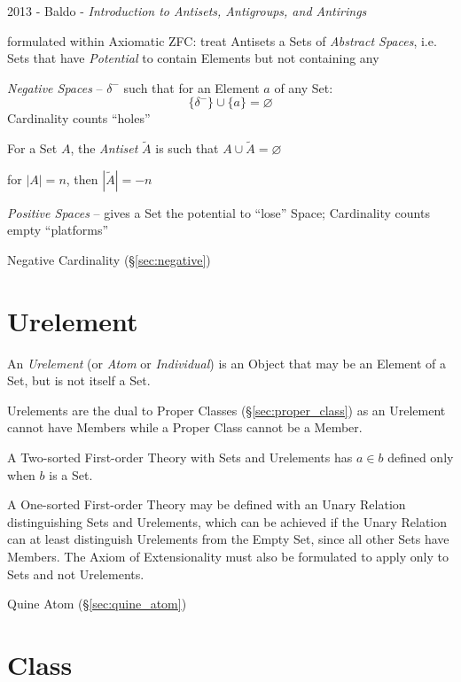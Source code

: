 2013 - Baldo - \emph{Introduction to Antisets, Antigroups, and Antirings}

formulated within Axiomatic ZFC: treat Antisets a Sets of \emph{Abstract
  Spaces}, i.e. Sets that have \emph{Potential} to contain Elements but not
containing any

\emph{Negative Spaces} -- $\delta^-$ such that for an Element $a$ of any Set:
\[
  \{\delta^-\} \cup \{a\} = \varnothing
\]
Cardinality counts ``holes''

For a Set $A$, the \emph{Antiset} $\tilde{A}$ is such that
$A \cup \tilde{A} = \varnothing$

for $|A|=n$, then $|\tilde{A}| = -n$

\emph{Positive Spaces} -- gives a Set the potential to ``lose'' Space;
Cardinality counts empty ``platforms''

\fist Negative Cardinality (\S\ref{sec:negative})



\section{Urelement}\label{sec:urelement}

An \emph{Urelement} (or \emph{Atom} or \emph{Individual}) is an Object
that may be an Element of a Set, but is not itself a Set.

Urelements are the dual to Proper Classes (\S\ref{sec:proper_class})
as an Urelement cannot have Members while a Proper Class cannot be a
Member.

A Two-sorted First-order Theory with Sets and Urelements has $a \in b$
defined only when $b$ is a Set.

A One-sorted First-order Theory may be defined with an Unary Relation
distinguishing Sets and Urelements, which can be achieved if the Unary
Relation can at least distinguish Urelements from the Empty Set, since
all other Sets have Members. The Axiom of Extensionality must also be
formulated to apply only to Sets and not Urelements.

Quine Atom (\S\ref{sec:quine_atom})



\section{Class}\label{sec:class}

